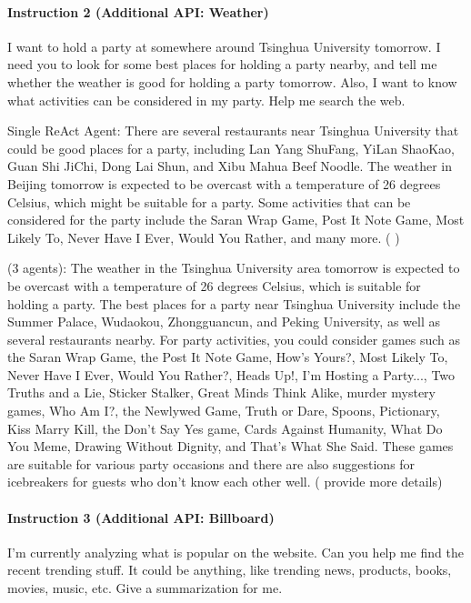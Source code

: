 \paragraph{Instruction 2 (Additional API: Weather)} I want to hold a party at somewhere around Tsinghua University tomorrow. I need you to look for some best places for holding a party nearby, and tell me whether the weather is good for holding a party tomorrow. Also, I want to know what activities can be considered in my party. Help me search the web.

{\color{blue} Single ReAct Agent}: There are several restaurants near Tsinghua University that could be good places for a party, including Lan Yang ShuFang, YiLan ShaoKao, Guan Shi JiChi, Dong Lai Shun, and Xibu Mahua Beef Noodle. The weather in Beijing tomorrow is expected to be overcast with a temperature of 26 degrees Celsius, which might be suitable for a party. Some activities that can be considered for the party include the Saran Wrap Game, Post It Note Game, Most Likely To, Never Have I Ever, Would You Rather, and many more. ({\color{teal} \cmark})

{\color{magenta} \framework (3 agents)}: The weather in the Tsinghua University area tomorrow is expected to be overcast with a temperature of 26 degrees Celsius, which is suitable for holding a party. The best places for a party near Tsinghua University include the Summer Palace, Wudaokou, Zhongguancun, and Peking University, as well as several restaurants nearby. For party activities, you could consider games such as the Saran Wrap Game, the Post It Note Game, How's Yours?, Most Likely To, Never Have I Ever, Would You Rather?, Heads Up!, I'm Hosting a Party..., Two Truths and a Lie, Sticker Stalker, Great Minds Think Alike, murder mystery games, Who Am I?, the Newlywed Game, Truth or Dare, Spoons, Pictionary, Kiss Marry Kill, the Don't Say Yes game, Cards Against Humanity, What Do You Meme, Drawing Without Dignity, and That's What She Said. These games are suitable for various party occasions and there are also suggestions for icebreakers for guests who don't know each other well. ({\color{teal} \cmark provide more details})

\paragraph{Instruction 3 (Additional API: Billboard)} I'm currently analyzing what is popular on the website. Can you help me find the recent trending stuff. It could be anything, like trending news, products, books, movies, music, etc. Give a summarization for me.

